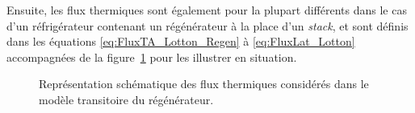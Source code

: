 Ensuite, les flux thermiques sont également pour la plupart différents dans le cas d'un réfrigérateur contenant un régénérateur à la place d'un \textit{stack}, et sont définis dans les équations \eqref{eq:FluxTA_Lotton_Regen} à \eqref{eq:FluxLat_Lotton} accompagnées de la figure~\ref{fig:Schema_FluxThermiquesNoyau_Gaelle} pour les illustrer en situation.

\begin{figure}[!ht]
    \centering
    
    \caption{Représentation schématique des flux thermiques considérés dans le modèle transitoire du régénérateur.}
    \label{fig:Schema_FluxThermiquesNoyau_Gaelle}
\end{figure}

